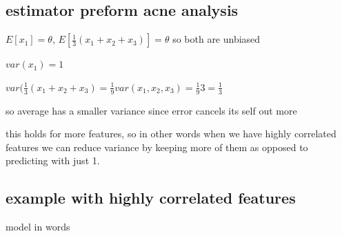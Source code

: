 \documentclass{article}
\begin{document}
\subsection{estimator preform acne analysis}
\item $E[x_1]=\theta$, $E[\frac{1}{3}(x_1+x_2+x_3)]=\theta$ so both are unbiased
\item $var(x_1)=1$
\item $var(\frac{1}{3}(x_1+x_2+x_3)=\frac{1}{9}var(x_1,x_2,x_3)=\frac{1}{9}3=\frac{1}{3}$
\item so average has a smaller variance since error cancels its self out more 
\item this holds for more features, so in other words when we have highly correlated features we can reduce variance by keeping more of them as opposed to predicting with just 1. 
\subsection{example with highly correlated features}
\item model in words
\end{document}
